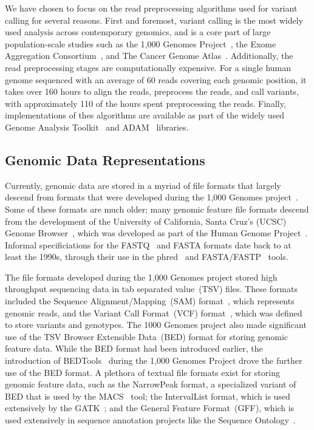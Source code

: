 \documentclass[phd]{ucbthesis}
\begin{document}
We have chosen to focus on the read preprocessing algorithms used for variant
calling for several reasons. First and foremost, variant calling is the most
widely used analysis across contemporary genomics, and is a core part of large
population-scale studies such as the 1,000 Genomes Project~\cite{1kg12, 1kg},
the Exome Aggregation Consortium~\cite{lek16}, and The Cancer Genome
Atlas~\cite{weinstein13}. Additionally, the read preprocessing stages are
computationally expensive. For a single human genome sequenced with
an average of 60 reads covering each genomic position, it takes over 160 hours
to align the reads, preprocess the reads, and call variants, with approximately
110 of the hours spent preprocessing the reads. Finally, implementations of thes
algorithms are available as part of the widely used {Genome Analysis
Toolkit}~\cite{mckenna10, depristo11} and {ADAM}~\cite{massie13,
nothaft15} libraries.

\subsection{Genomic Data Representations}
\label{sec:genomic-data-representations}

Currently, genomic data are stored in a myriad of file formats that largely
descend from formats that were developed during the 1,000 Genomes
project~\cite{1kg}. Some of these formats are much older; many genomic feature
file formats descend from the development of the University of California,
Santa Cruz's (UCSC) Genome Browser~\cite{kent02}, which was developed as part
of the Human Genome Project~\cite{lander01}. Informal specificiations for
the FASTQ~\cite{cock10} and FASTA formats date back to at least the 1990s,
through their use in the {phred}~\cite{ewing98} and
{FASTA}/{FASTP}~\cite{pearson90} tools.

The file formats developed during the 1,000 Genomes project stored high
throughput sequencing data in tab separated value~(TSV) files. These
formats included the {Sequence Alignment/Mapping}~(SAM)
format~\cite{li09}, which represents genomic reads, and the {Variant Call
  Format}~(VCF) format~\cite{danecek11}, which was defined to store variants
and genotypes. The 1000 Genomes project also made significant use of the
TSV {Browser Extensible Data}~(BED) format for storing genomic feature
data. While the BED format had been introduced earlier, the introduction of
{BEDTools}~\cite{quinlan10} during the 1,000 Genomes Project drove
the further use of the BED format. A plethora of textual file formats exist for
storing genomic feature data, such as the {NarrowPeak} format, a
specialized variant of BED that is used by the {MACS}~\cite{zhang08}
tool; the {IntervalList} format, which is used extensively by the
{GATK}~\cite{depristo11}; and the {General Feature Format}~(GFF),
which is used extensively in sequence annotation projects like the Sequence
Ontology~\cite{eilbeck05}.
\end{document}
